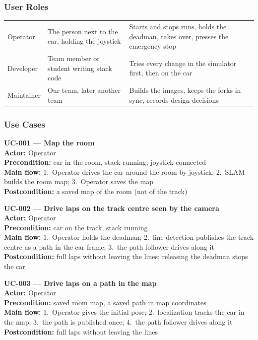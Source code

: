 \documentclass[11pt,a4paper]{article}
\begin{document}
\subsubsection{User Roles}
\begin{tabularx}{\textwidth}{@{}L{3.5cm} Y Y@{}}
\toprule
{} &  &  \\
\midrule
Operator & The person next to the car, holding the joystick & Starts and stops runs, holds the deadman, takes over, presses the emergency stop \\
Developer & Team member or student writing stack code & Tries every change in the simulator first, then on the car \\
Maintainer & Our team, later another team & Builds the images, keeps the forks in sync, records design decisions \\
\bottomrule
\end{tabularx}

\subsubsection{Use Cases}
\begin{takeaway}
\textbf{UC-001 --- Map the room}\\
\textbf{Actor:} Operator\\
\textbf{Precondition:} car in the room, stack running, joystick connected\\
\textbf{Main flow:} 1.~Operator drives the car around the room by joystick; 2.~SLAM builds the room map; 3.~Operator saves the map\\
\textbf{Postcondition:} a saved map of the room (not of the track)
\end{takeaway}

\begin{takeaway}
\textbf{UC-002 --- Drive laps on the track centre seen by the camera}\\
\textbf{Actor:} Operator\\
\textbf{Precondition:} car on the track, stack running\\
\textbf{Main flow:} 1.~Operator holds the deadman; 2.~line detection publishes the track centre as a path in the car frame; 3.~the path follower drives along it\\
\textbf{Postcondition:} full laps without leaving the lines; releasing the deadman stops the car
\end{takeaway}

\begin{takeaway}
\textbf{UC-003 --- Drive laps on a path in the map}\\
\textbf{Actor:} Operator\\
\textbf{Precondition:} saved room map, a saved path in map coordinates \tbd[OI-03]\\
\textbf{Main flow:} 1.~Operator gives the initial pose; 2.~localization tracks the car in the map; 3.~the path is published once; 4.~the path follower drives along it\\
\textbf{Postcondition:} full laps without leaving the lines
\end{takeaway}
\end{document}
